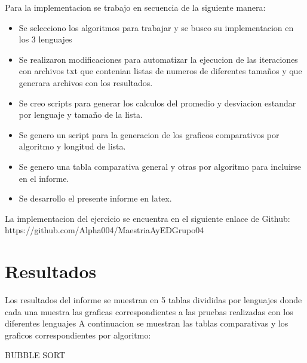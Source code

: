 \documentclass[12pt]{article} %
\begin{document}
Para la implementacion se trabajo en secuencia de la siguiente manera:
\begin{itemize}
    \item Se selecciono los algoritmos para trabajar y se busco su implementacion en los 3 lenguajes
    \item Se realizaron modificaciones para automatizar la ejecucion de las iteraciones con archivos txt que contenian listas de numeros de diferentes tamaños y que generara archivos con los resultados.
    \item Se creo scripts para generar los calculos del promedio y desviacion estandar por lenguaje y tamaño de la lista.
    \item Se genero un script para la generacion de los graficos comparativos por algoritmo y longitud de lista.
    \item Se genero una tabla comparativa general y otras por algoritmo para incluirse en el informe.
    \item Se desarrollo el presente informe en latex.
\end{itemize}

La implementacion del ejercicio se encuentra en el siguiente enlace de Github: https://github.com/Alpha004/MaestriaAyEDGrupo04
\section{Resultados}

Los resultados del informe se muestran en 5 tablas divididas por lenguajes donde cada una muestra las graficas correspondientes a las pruebas realizadas con los diferentes lenguajes
A continuacion se muestran las tablas comparativas y los graficos correspondientes por algoritmo:

\vspace{15cm}

BUBBLE SORT

\vspace{5mm}
\end{document}
